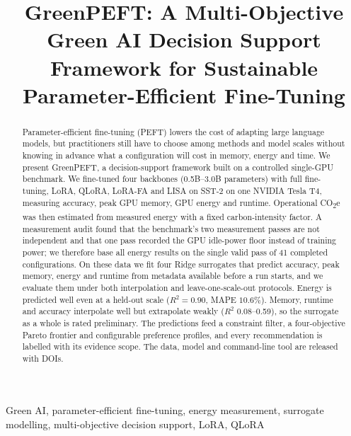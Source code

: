 \documentclass[conference]{IEEEtran}
\newcommand{\COtwo}{CO\textsubscript{2}e}
\begin{document}
\title{GreenPEFT: A Multi-Objective Green AI Decision Support Framework for Sustainable
Parameter-Efficient Fine-Tuning}

\author{
}

\maketitle

\begin{abstract}
Parameter-efficient fine-tuning (PEFT) lowers the cost of adapting large language models,
but practitioners still have to choose among methods and model scales without knowing in
advance what a configuration will cost in memory, energy and time. We present GreenPEFT, a
decision-support framework built on a controlled single-GPU benchmark. We fine-tuned four
backbones (0.5B--3.0B parameters) with full fine-tuning, LoRA, QLoRA, LoRA-FA and LISA on
SST-2 on one NVIDIA Tesla T4, measuring accuracy, peak GPU memory, GPU energy and runtime.
Operational \COtwo{} was then estimated from measured energy with a fixed carbon-intensity
factor. A measurement audit found that the benchmark's two measurement passes are not
independent and that one pass recorded the GPU idle-power floor instead of training power; we
therefore base all energy results on the single valid pass of 41 completed configurations.
On these data we fit four Ridge surrogates that predict accuracy, peak memory, energy and
runtime from metadata available before a run starts, and we evaluate them under both
interpolation and leave-one-scale-out protocols. Energy is predicted well even at a held-out
scale ($R^2=0.90$, MAPE $10.6\%$). Memory, runtime and accuracy interpolate well but
extrapolate weakly ($R^2$ 0.08--0.59), so the surrogate as a whole is rated preliminary. The
predictions feed a constraint filter, a four-objective Pareto frontier and configurable
preference profiles, and every recommendation is labelled with its evidence scope. The data,
model and command-line tool are released with DOIs.
\end{abstract}

\begin{IEEEkeywords}
Green AI, parameter-efficient fine-tuning, energy measurement, surrogate modelling,
multi-objective decision support, LoRA, QLoRA
\end{IEEEkeywords}
\end{document}
